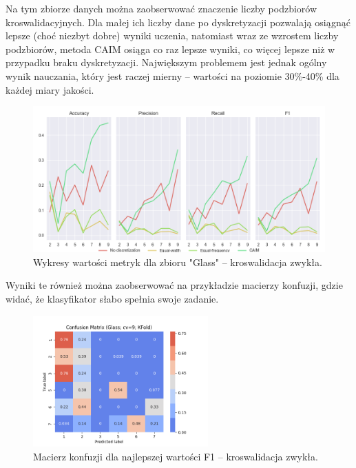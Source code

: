 Na tym zbiorze danych można zaobserwować znaczenie liczby podzbiorów kroswalidacyjnych.
Dla małej ich liczby dane po dyskretyzacji pozwalają osiągnąć lepsze (choć niezbyt dobre)
wyniki uczenia, natomiast wraz ze wzrostem liczby podzbiorów, metoda CAIM osiąga co raz
lepsze wyniki, co więcej lepsze niż w przypadku braku dyskretyzacji. Największym problemem
jest jednak ogólny wynik nauczania, który jest raczej mierny -- wartości na poziomie 30\%-40\%
dla każdej miary jakości.

\begin{figure}[H]
\center
    \includegraphics[width=\textwidth]{img/cv_scores_kfold/scoring_kfold_glass.png}
    \caption{Wykresy wartości metryk dla zbioru "Glass" -- kroswalidacja zwykła.}
\end{figure}

Wyniki te również można zaobserwować na przykładzie macierzy konfuzji, gdzie widać, że
klasyfikator słabo spełnia swoje zadanie.
\begin{figure}[H]
\center
    \includegraphics[width=0.6\textwidth]{img/conf_matrices/cm_Glass_cv9_KFold.png}
    \caption{Macierz konfuzji dla najlepszej wartości F1 -- kroswalidacja zwykła.}
\end{figure}

